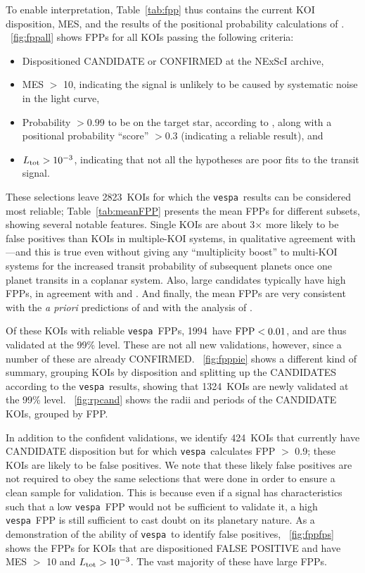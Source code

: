 \documentclass{emulateapj}
\newcommand{\figref}[1]{\ref{fig:#1}}
\newcommand{\Fig}[1]{\figurename~\figref{#1}}
\newcommand{\Tab}[1]{Table~\ref{tab:#1}}
\newcommand{\tab}[1]{\Tab{#1}}
\newcommand{\nreliable}{2823} %
\newcommand{\nval}{1994} %
\newcommand{\nvalnew}{1324} %
\newcommand{\nfpnew}{424}  %
\newcommand{\posprobthresh}{0.3}
\newcommand{\vespa}{\texttt{vespa}}
\begin{document}
To enable interpretation, \tab{fpp} thus contains the current KOI
disposition, MES, and the results of the positional probability calculations
of \citet{Bryson:KSCI}.  \Fig{fppall} shows FPPs for all KOIs passing
the following criteria:
\begin{itemize}
\item Dispositioned CANDIDATE or CONFIRMED at the NExScI archive,
\item MES $>$ 10, indicating the signal is unlikely to be caused by 
      systematic noise in the light curve,
\item Probability $> 0.99$ to be on the target star, according
  to \citet{Bryson:KSCI}, along with a positional probability
  ``score'' $> \posprobthresh$ (indicating a reliable result), and   
\item $L_{\rm tot} > 10^{-3}$, indicating that not all the hypotheses are
  poor fits to the transit signal.
\end{itemize}

These selections leave \nreliable\ KOIs for which the \vespa\ results
can be considered most reliable;  \Tab{meanFPP} presents the mean FPPs
for different subsets, showing several notable features.  Single KOIs
are about 3$\times$ more likely to be false positives than KOIs in
multiple-KOI systems, in qualitative agreement with
\citet{Lissauer:2012}---and this is true even without giving any
``multiplicity boost'' to multi-KOI systems for the increased transit
probability of subsequent planets once one planet transits in a
coplanar system.  Also, large candidates typically have high FPPs, in
agreement with \citet{Santerne:2012} and \citet{Santerne:2015}.  And
finally, the mean FPPs are very consistent with the \textit{a priori}
predictions of \citet{Morton:2011b} and with the analysis of
\citet{Fressin:2013}.

Of these KOIs with reliable \vespa\ FPPs, \nval\ have ${\rm FPP}
<0.01$, and are thus validated at the 99\% level.  These are not all
new validations, however, since a number of these are already
CONFIRMED.  \Fig{fpppie} shows a different kind of summary, grouping
KOIs by disposition and splitting up the CANDIDATES according to the
\vespa\ results, showing that \nvalnew\ KOIs are newly validated at
the 99\% level. \Fig{rpcand} shows the radii and periods of the
CANDIDATE KOIs, grouped by FPP.

In addition to the confident validations, we identify \nfpnew\ KOIs
that currently have CANDIDATE disposition but for which \vespa\
calculates FPP $>$ 0.9; these KOIs are likely to be false positives.
We note that these likely false positives are not required to obey the
same selections that were done in order to ensure a clean sample for
validation.  This is because even if a signal has characteristics
such that a low \vespa\ FPP would not be  sufficient to validate it, a
high \vespa\ FPP is still sufficient to cast doubt on its planetary
nature.  As a demonstration of the ability of \vespa\ to identify 
false positives, \Fig{fppfps} shows the FPPs for KOIs that are 
dispositioned FALSE POSITIVE and have MES $>$ 10 and $L_{\rm tot} > 10^{-3}$.
The vast majority of these have large FPPs.
\end{document}
